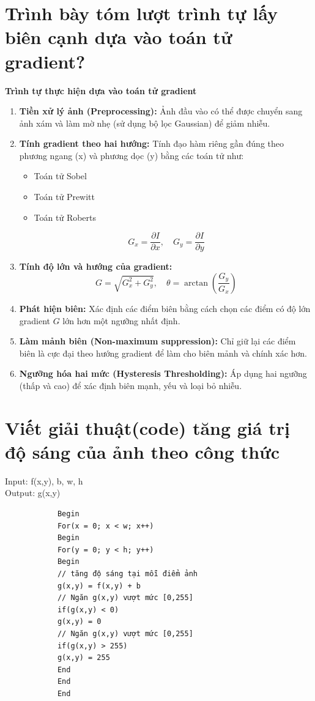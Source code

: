\documentclass[12pt]{article}
\begin{document}
	\section{Trình bày tóm lượt trình tự lấy biên cạnh dựa vào toán tử gradient?}
	
	\textbf{Trình tự thực hiện dựa vào toán tử gradient}
	
	\begin{enumerate}[label=\textbf{Bước \arabic*:}]
	\item \textbf{Tiền xử lý ảnh (Preprocessing):}  
	Ảnh đầu vào có thể được chuyển sang ảnh xám và làm mờ nhẹ (sử dụng bộ lọc Gaussian) để giảm nhiễu.
	
	\item \textbf{Tính gradient theo hai hướng:}  
	Tính đạo hàm riêng gần đúng theo phương ngang (x) và phương dọc (y) bằng các toán tử như:
	\begin{itemize}
	\item Toán tử Sobel
	\item Toán tử Prewitt
	\item Toán tử Roberts
	\end{itemize}
	\[
	G_x = \frac{\partial I}{\partial x}, \quad G_y = \frac{\partial I}{\partial y}
	\]
	
	\item \textbf{Tính độ lớn và hướng của gradient:}  
	\[
	G = \sqrt{G_x^2 + G_y^2}, \quad \theta = \arctan\left(\frac{G_y}{G_x}\right)
	\]
	
	\item \textbf{Phát hiện biên:}  
	Xác định các điểm biên bằng cách chọn các điểm có độ lớn gradient $G$ lớn hơn một ngưỡng nhất định.
	
	\item \textbf{Làm mảnh biên (Non-maximum suppression):}  
	Chỉ giữ lại các điểm biên là cực đại theo hướng gradient để làm cho biên mảnh và chính xác hơn.
	
	\item \textbf{Ngưỡng hóa hai mức (Hysteresis Thresholding):}  
	Áp dụng hai ngưỡng (thấp và cao) để xác định biên mạnh, yếu và loại bỏ nhiễu.
	
	\end{enumerate}
	
	\section{Viết giải thuật(code) tăng giá trị độ sáng của ảnh theo công thức}
	
	\begin{tcolorbox}[colback=gray!5!white, colframe=black, title=Pseudo-code]
		Input: f(x,y), b, w, h\\
		Output: g(x,y)
		
		\begin{verbatim}
			Begin
			For(x = 0; x < w; x++)
			Begin
			For(y = 0; y < h; y++)
			Begin
			// tăng độ sáng tại mỗi điểm ảnh
			g(x,y) = f(x,y) + b 
			// Ngăn g(x,y) vượt mức [0,255]
			if(g(x,y) < 0)	 
			g(x,y) = 0
			// Ngăn g(x,y) vượt mức [0,255]
			if(g(x,y) > 255) 
			g(x,y) = 255
			End
			End
			End
		\end{verbatim}
	\end{tcolorbox}
	
\end{document}
